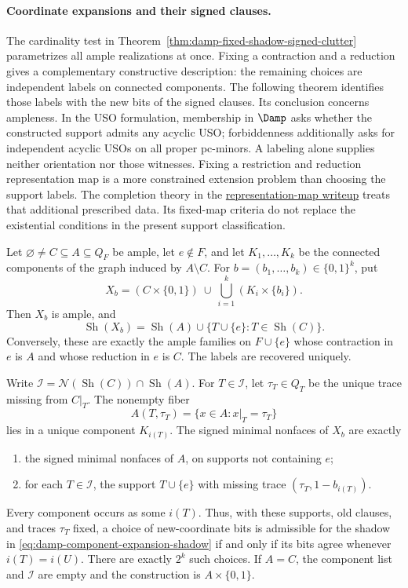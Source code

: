 \paragraph{Coordinate expansions and their signed clauses.}
The cardinality test in
Theorem~\ref{thm:damp-fixed-shadow-signed-clutter} parametrizes all ample
realizations at once.  Fixing a contraction and a reduction gives
a complementary constructive description: the remaining choices are
independent labels on connected components.  The following theorem identifies
those labels with the new bits of the signed clauses.  Its conclusion concerns ampleness. In the USO formulation, membership in
$\Damp$ asks whether the constructed support admits any acyclic USO;
forbiddenness additionally asks for independent acyclic USOs on all proper
pc-minors. A labeling alone supplies neither orientation nor those witnesses.
Fixing a restriction and reduction representation map is a more constrained
extension problem than choosing the support labels. The completion theory
in the \href{research/ample_filtrations.pdf}{representation-map writeup}
treats that additional prescribed data. Its fixed-map criteria do not
replace the existential conditions in the present support classification.

\begin{theorem}
\label{thm:damp-component-expansion-signs}
Let $\varnothing\ne C\subseteq A\subseteq Q_F$ be ample, let $e\notin F$,
and let $K_1,\ldots,K_k$ be the connected components of the graph induced
by $A\setminus C$.  For $b=(b_1,\ldots,b_k)\in\{0,1\}^k$, put
\[
 X_b=(C\times\{0,1\})\ \cup\
       \bigcup_{i=1}^k(K_i\times\{b_i\}).
\]
Then $X_b$ is ample, and
\begin{equation}
 \operatorname{Sh}(X_b)=\operatorname{Sh}(A)
       \cup\{T\cup\{e\}:T\in\operatorname{Sh}(C)\}.
 \label{eq:damp-component-expansion-shadow}
\end{equation}
Conversely, these are exactly the ample families on $F\cup\{e\}$ whose
contraction in $e$ is $A$ and whose reduction in $e$ is $C$.
The labels are recovered uniquely.

Write $\mathcal I=\mathcal N(\operatorname{Sh}(C))\cap
\operatorname{Sh}(A)$.  For $T\in\mathcal I$, let $\tau_T\in Q_T$
be the unique trace missing from $C|_T$.  The nonempty fiber
\[
 A(T,\tau_T)=\{x\in A:x|_T=\tau_T\}
\]
lies in a unique component $K_{i(T)}$.  The signed minimal nonfaces of
$X_b$ are exactly
\begin{enumerate}
 \item the signed minimal nonfaces of $A$, on supports not containing $e$;
 \item for each $T\in\mathcal I$, the support $T\cup\{e\}$ with missing
       trace $(\tau_T,1-b_{i(T)})$.
\end{enumerate}
Every component occurs as some $i(T)$.  Thus, with these supports, old
clauses, and traces $\tau_T$ fixed, a choice of new-coordinate bits is
admissible for the shadow in \eqref{eq:damp-component-expansion-shadow}
if and only if its bits agree whenever $i(T)=i(U)$.  There are exactly
$2^k$ such choices.  If $A=C$, the component list and $\mathcal I$ are
empty and the construction is $A\times\{0,1\}$.
\end{theorem}

